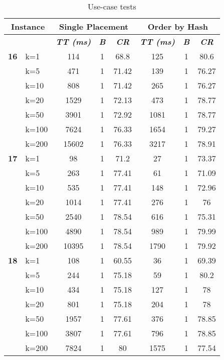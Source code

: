     \begin{table}[htbp]
    \caption{Use-case tests}
    \centering
    \begin{tabular}{|l|l|c|c|c|c|c|c|}
    
    \multicolumn{ 2}{|c|}{\textbf{Instance}} & \multicolumn{ 3}{c|}{\textbf{Single Placement}} & \multicolumn{ 3}{c|}{\textbf{Order by Hash}} \\ \hline
    \multicolumn{ 2}{|l|}{} & \textbf{\textit{TT (ms)}} & \textbf{\textit{B}} & \textbf{\textit{CR}} & \textbf{\textit{TT (ms)}} & \textbf{\textit{B}} & \textbf{\textit{CR}} \\ \hline
    \multicolumn{1}{|r|}{\textbf{16}} & k=1 & 114 & 1 & 68.8 & 125 & 1 & 80.6 \\ 
     & k=5 & 471 & 1 & 71.42 & 139 & 1 & 76.27 \\ 
     & k=10 & 808 & 1 & 71.42 & 265 & 1 & 76.27 \\ 
     & k=20 & 1529 & 1 & 72.13 & 473 & 1 & 78.77 \\ 
     & k=50 & 3901 & 1 & 72.92 & 1081 & 1 & 78.77 \\ 
     & k=100 & 7624 & 1 & 76.33 & 1654 & 1 & 79.27 \\ 
     & k=200 & 15602 & 1 & 76.33 & 3217 & 1 & 78.91 \\ \hline
    \multicolumn{1}{|r|}{\textbf{17}} & k=1 & 98 & 1 & 71.2 & 27 & 1 & 73.37 \\ 
     & k=5 & 263 & 1 & 77.41 & 61 & 1 & 71.09 \\ 
     & k=10 & 535 & 1 & 77.41 & 148 & 1 & 72.96 \\ 
     & k=20 & 1014 & 1 & 77.41 & 276 & 1 & 76 \\ 
     & k=50 & 2540 & 1 & 78.54 & 616 & 1 & 75.31 \\ 
     & k=100 & 4890 & 1 & 78.54 & 989 & 1 & 79.99 \\ 
     & k=200 & 10395 & 1 & 78.54 & 1790 & 1 & 79.92 \\ \hline
    \multicolumn{1}{|r|}{\textbf{18}} & k=1 & 108 & 1 & 60.55 & 36 & 1 & 69.39 \\ 
     & k=5 & 244 & 1 & 75.18 & 59 & 1 & 80.2 \\ 
     & k=10 & 434 & 1 & 75.18 & 127 & 1 & 78 \\ 
     & k=20 & 801 & 1 & 75.18 & 204 & 1 & 78 \\ 
     & k=50 & 1957 & 1 & 77.61 & 376 & 1 & 78.85 \\ 
     & k=100 & 3807 & 1 & 77.61 & 796 & 1 & 78.85 \\ 
     & k=200 & 7824 & 1 & 80 & 1575 & 1 & 77.54 \\ \hline

\end{tabular}
\end{table}

